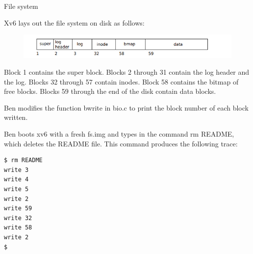 \documentclass[11pt]{exam}
\def\answers{1}
\begin{document}
\begin{questions}

\addpoints
\question File system


Xv6 lays out the file system on disk as follows:

\begin{figure}[h] \centering
  \includegraphics[width=0.8\columnwidth]{tempfig} %
  \label{fig:ramengine-decomposed-app}

\end{figure}

Block 1 contains the super block. Blocks 2 through 31 contain the log header
and the log. Blocks 32 through 57 contain inodes. Block 58 contains the bitmap
of free blocks. Blocks 59 through the end of the disk contain data blocks.

Ben modifies the function bwrite in bio.c to print the block number of each
block written.

Ben boots xv6 with a fresh fs.img and types in the
command rm README, which deletes the README file.
This command produces the following trace:

\begin{verbatim} 
$ rm README
write 3
write 4
write 5
write 2
write 59
write 32
write 58
write 2
$
\end{verbatim}

\end{questions}
\end{document}
